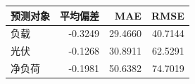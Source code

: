 \begin{tabular}{lrrr}
\toprule
预测对象 & 平均偏差 & MAE & RMSE \\
\midrule
负载 & -0.3249 & 29.4660 & 40.7144 \\
光伏 & -0.1268 & 30.8911 & 62.5291 \\
净负荷 & -0.1981 & 50.6382 & 74.7019 \\
\bottomrule
\end{tabular}
